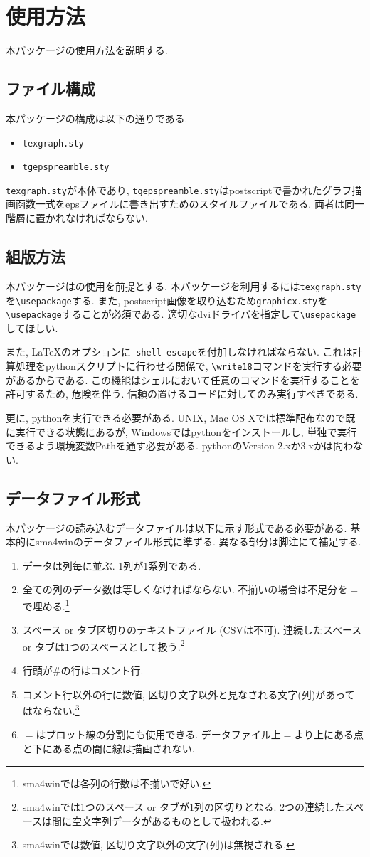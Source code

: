 \documentclass[10pt,a4j,twoside]{jsarticle}
\def\Section#1{%
\clearpage
\section{#1}
\markboth{\thesection\hspace{1zw}#1}{\texttt{texgraph}コマンドリファレンス}%
}
\begin{document}
\Section{使用方法}
本パッケージの使用方法を説明する.

\subsection{ファイル構成}
本パッケージの構成は以下の通りである.
\begin{itemize}
\item \texttt{texgraph.sty}
\item \texttt{tgepspreamble.sty}
\end{itemize}
\texttt{texgraph.sty}が本体であり, \texttt{tgepspreamble.sty}はpostscriptで書かれたグラフ描画函数一式をepsファイルに書き出すためのスタイルファイルである.
両者は同一階層に置かれなければならない.

\subsection{組版方法}
本パッケージは\LaTeXe{}の使用を前提とする.
本パッケージを利用するには\texttt{texgraph.sty}を\verb|\usepackage|する.
また, postscript画像を取り込むため\texttt{graphicx.sty}を\verb|\usepackage|することが必須である.
適切なdviドライバを指定して\verb|\usepackage|してほしい.

また, \LaTeX{}のオプションに\texttt{--shell-escape}を付加しなければならない.
これは計算処理をpythonスクリプトに行わせる関係で, \verb|\write18|コマンドを実行する必要があるからである.
この機能はシェルにおいて任意のコマンドを実行することを許可するため, 危険を伴う.
信頼の置けるコードに対してのみ実行すべきである.

更に, pythonを実行できる必要がある.
UNIX, Mac OS Xでは標準配布なので既に実行できる状態にあるが, Windowsではpythonをインストールし, 単独で実行できるよう環境変数Pathを通す必要がある.
pythonのVersion 2.xか3.xかは問わない.

\subsection{データファイル形式}
本パッケージの読み込むデータファイルは以下に示す形式である必要がある.
基本的にsma4winのデータファイル形式に準ずる. 異なる部分は脚注にて補足する.
\begin{enumerate}
\item データは列毎に並ぶ. 1列が1系列である.
\item 全ての列のデータ数は等しくなければならない. 不揃いの場合は不足分を$=$で埋める.\footnote{sma4winでは各列の行数は不揃いで好い.}
\item スペース or タブ区切りのテキストファイル (CSVは不可). 連続したスペース or タブは1つのスペースとして扱う.\footnote{sma4winでは1つのスペース or タブが1列の区切りとなる. 2つの連続したスペースは間に空文字列データがあるものとして扱われる.}
\item 行頭が\#の行はコメント行.
\item コメント行以外の行に数値, 区切り文字以外と見なされる文字(列)があってはならない.\footnote{sma4winでは数値, 区切り文字以外の文字(列)は無視される.}
\item $=$はプロット線の分割にも使用できる. データファイル上$=$より上にある点と下にある点の間に線は描画されない.
\end{enumerate}
\end{document}
